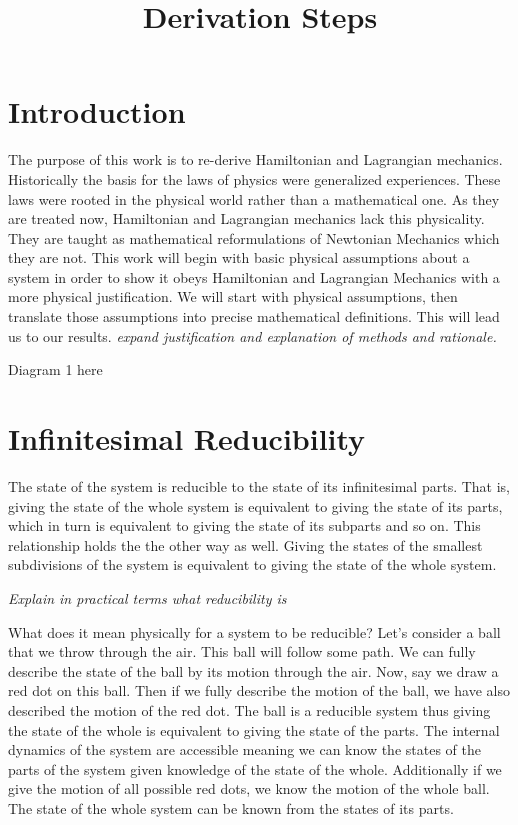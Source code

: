 \documentclass{article}
\begin{document}
\title{Derivation Steps}

\section{Introduction}

	The purpose of this work is to re-derive Hamiltonian and Lagrangian mechanics. Historically the basis for the laws of physics were generalized experiences. These laws were rooted in the physical world rather than a mathematical one. As they are treated now, Hamiltonian and Lagrangian mechanics lack this physicality. They are taught as mathematical reformulations of Newtonian Mechanics which they are not. This work will begin with basic physical assumptions about a system in order to show it obeys Hamiltonian and Lagrangian Mechanics with a more physical justification. We will start with physical assumptions, then translate those assumptions into precise mathematical definitions. This will lead us to our results. \emph{expand justification and explanation of methods and rationale.}
	
Diagram 1 here

\section{Infinitesimal Reducibility}
	
\begin{assump}
	The state of the system is reducible to the state of its infinitesimal parts. That is, giving the state of the whole system is equivalent to giving the state of its parts, which in turn is equivalent to giving the state of its subparts and so on. This relationship holds the the other way as well. Giving the states of the smallest subdivisions of the system is equivalent to giving the state of the whole system.
\end{assump}
	
	\emph{Explain in practical terms what reducibility is}
	
	What does it mean physically for a system to be reducible? Let's consider a ball that we throw through the air. This ball will follow some path. We can fully describe the state of the ball by its motion through the air. Now, say we draw a red dot on this ball. Then if we fully describe the motion of the ball, we have also described the motion of the red dot. The ball is a reducible system thus giving the state of the whole is equivalent to giving the state of the parts. The internal dynamics of the system are accessible meaning we can know the states of the parts of the system given knowledge of the state of the whole. Additionally if we give the motion of all possible red dots, we know the motion of the whole ball. The state of the whole system can be known from the states of its parts. 
	
\end{document}

